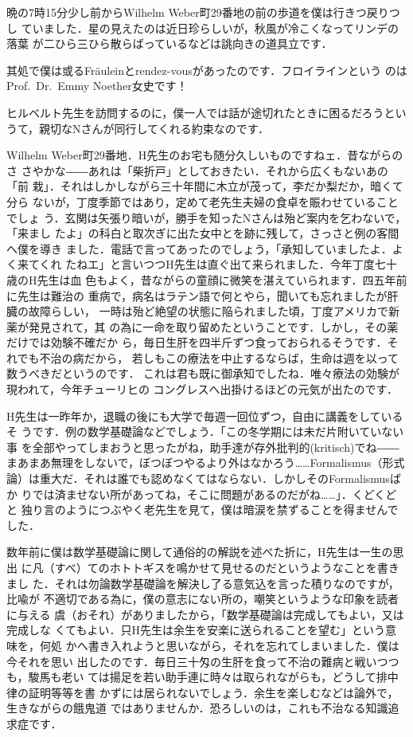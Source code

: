 \documentclass[20pt]{ltjsarticle}
\begin{document}
\thispagestyle{plain}
晩の7時15分少し前からWilhelm Weber町29番地の前の歩道を僕は行きつ戻りつし
ていました．星の見えたのは近日珍らしいが，秋風が冷こくなってリンデの落葉
が二ひら三ひら散らばっているなどは誂向きの道具立です．

其処で僕は或るFr\"auleinとrendez-vousがあったのです．フロイラインという
のはProf.\ Dr.\ Emmy Noether女史です！

ヒルベルト先生を訪問するのに，僕一人では話が途切れたときに困るだろうとい
うて，親切なNさんが同行してくれる約束なのです．

Wilhelm Weber町29番地．H先生のお宅も随分久しいものですねェ．昔ながらのさ
さやかな――あれは「柴折戸」としておきたい．それから広くもないあの「前
栽」．それはしかしながら三十年間に木立が茂って，李だか梨だか，暗くて分ら
ないが，丁度季節ではあり，定めて老先生夫婦の食卓を賑わせていることでしょ
う．玄関は矢張り暗いが，勝手を知ったNさんは殆ど案内を乞わないで，「来まし
たよ」の科白と取次ぎに出た女中とを跡に残して，さっさと例の客間へ僕を導き
ました．電話で言ってあったのでしょう，「承知していましたよ．よく来てくれ
たねエ」と言いつつH先生は直ぐ出て来られました．今年丁度七十歳のH先生は血
色もよく，昔ながらの童顔に微笑を湛えていられます．四五年前に先生は難治の
重病で，病名はラテン語で何とやら，聞いても忘れましたが肝臓の故障らしい，
一時は殆ど絶望の状態に陥られました頃，丁度アメリカで新薬が発見されて，其
の為に一命を取り留めたということです．しかし，その薬だけでは効験不確だか
ら，毎日生肝を四半斤ずつ食っておられるそうです．それでも不治の病だから，
若しもこの療法を中止するならば，生命は週を以って数うべきだというのです．
これは君も既に御承知でしたね．唯々療法の効験が現われて，今年チューリヒの
コングレスへ出掛けるほどの元気が出たのです．

H先生は一昨年か，退職の後にも大学で毎週一回位ずつ，自由に講義をしているそ
うです．例の数学基礎論などでしょう．「この冬学期には未だ片附いていない事
を全部やってしまおうと思ったがね，助手達が存外批判的(kritisch)でね――
まあまあ無理をしないで，ぼつぼつやるより外はなかろう……Formalismus（形式
論）は重大だ．それは誰でも認めなくてはならない．しかしそのFormalismusばか
りでは済ませない所があってね，そこに問題があるのだがね……」．くどくどと
独り言のようにつぶやく老先生を見て，僕は暗涙を禁ずることを得ませんでした．

数年前に僕は数学基礎論に関して通俗的の解説を述べた折に，H先生は一生の思出
に凡（すべ）てのホトトギスを鳴かせて見せるのだというようなことを書きまし
た．それは勿論数学基礎論を解決し了る意気込を言った積りなのですが，比喩が
不適切である為に，僕の意志にない所の，嘲笑というような印象を読者に与える
虞（おそれ）がありましたから，「数学基礎論は完成してもよい，又は完成しな
くてもよい．只H先生は余生を安楽に送られることを望む」という意味を，何処
かへ書き入れようと思いながら，それを忘れてしまいました．僕は今それを思い
出したのです．毎日三十匁の生肝を食って不治の難病と戦いつつも，駿馬も老い
ては揚足を若い助手連に時々は取られながらも，どうして排中律の証明等等を書
かずには居られないでしょう．余生を楽しむなどは論外で，生きながらの餓鬼道
ではありませんか．恐ろしいのは，これも不治なる知識追求症です．
\end{document}
